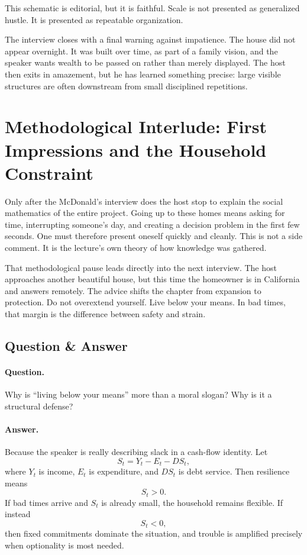 This schematic is editorial, but it is faithful. Scale is not presented as generalized hustle. It is presented as repeatable organization.

The interview closes with a final warning against impatience. The house did not appear overnight. It was built over time, as part of a family vision, and the speaker wants wealth to be passed on rather than merely displayed. The host then exits in amazement, but he has learned something precise: large visible structures are often downstream from small disciplined repetitions.

\section{Methodological Interlude: First Impressions and the Household Constraint}

Only after the McDonald's interview does the host stop to explain the social mathematics of the entire project. Going up to these homes means asking for time, interrupting someone's day, and creating a decision problem in the first few seconds. One must therefore present oneself quickly and cleanly. This is not a side comment. It is the lecture's own theory of how knowledge was gathered.

That methodological pause leads directly into the next interview. The host approaches another beautiful house, but this time the homeowner is in California and answers remotely. The advice shifts the chapter from expansion to protection. Do not overextend yourself. Live below your means. In bad times, that margin is the difference between safety and strain.

\subsection{Question \& Answer}

\paragraph{Question.} Why is ``living below your means'' more than a moral slogan? Why is it a structural defense?

\paragraph{Answer.} Because the speaker is really describing slack in a cash-flow identity. Let
\begin{equation}
S_t = Y_t - E_t - DS_t,
\end{equation}
where \(Y_t\) is income, \(E_t\) is expenditure, and \(DS_t\) is debt service. Then resilience means
\begin{equation}
S_t > 0.
\end{equation}
If bad times arrive and \(S_t\) is already small, the household remains flexible. If instead
\begin{equation}
S_t < 0,
\end{equation}
then fixed commitments dominate the situation, and trouble is amplified precisely when optionality is most needed.

